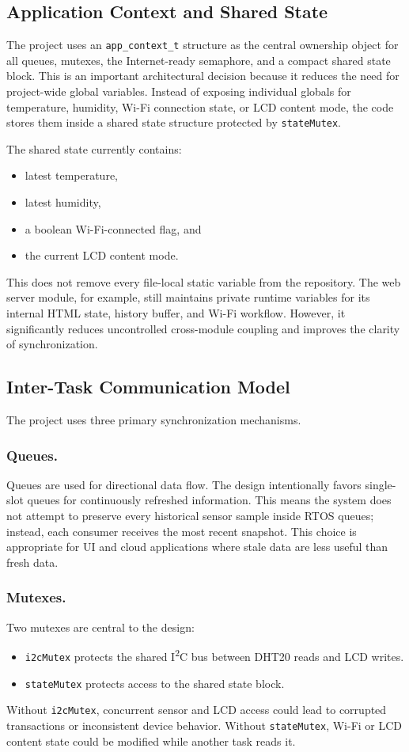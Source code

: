 \subsection{Application Context and Shared State}
The project uses an \texttt{app\_context\_t} structure as the central ownership
object for all queues, mutexes, the Internet-ready semaphore, and a compact
shared state block. This is an important architectural decision because it
reduces the need for project-wide global variables. Instead of exposing
individual globals for temperature, humidity, Wi-Fi connection state, or LCD
content mode, the code stores them inside a shared state structure protected by
\texttt{stateMutex}.

The shared state currently contains:
\begin{itemize}
  \item latest temperature,
  \item latest humidity,
  \item a boolean Wi-Fi-connected flag, and
  \item the current LCD content mode.
\end{itemize}

This does not remove every file-local static variable from the repository. The
web server module, for example, still maintains private runtime variables for
its internal HTML state, history buffer, and Wi-Fi workflow. However, it
significantly reduces uncontrolled cross-module coupling and improves the
clarity of synchronization.

\subsection{Inter-Task Communication Model}
The project uses three primary synchronization mechanisms.

\subsubsection*{Queues.}
Queues are used for directional data flow. The design intentionally favors
single-slot queues for continuously refreshed information. This means the system
does not attempt to preserve every historical sensor sample inside RTOS queues;
instead, each consumer receives the most recent snapshot. This choice is
appropriate for UI and cloud applications where stale data are less useful than
fresh data.

\subsubsection*{Mutexes.}
Two mutexes are central to the design:
\begin{itemize}
  \item \texttt{i2cMutex} protects the shared I\textsuperscript{2}C bus between
  DHT20 reads and LCD writes.
  \item \texttt{stateMutex} protects access to the shared state block.
\end{itemize}
Without \texttt{i2cMutex}, concurrent sensor and LCD access could lead to
corrupted transactions or inconsistent device behavior. Without
\texttt{stateMutex}, Wi-Fi or LCD content state could be modified while another
task reads it.


